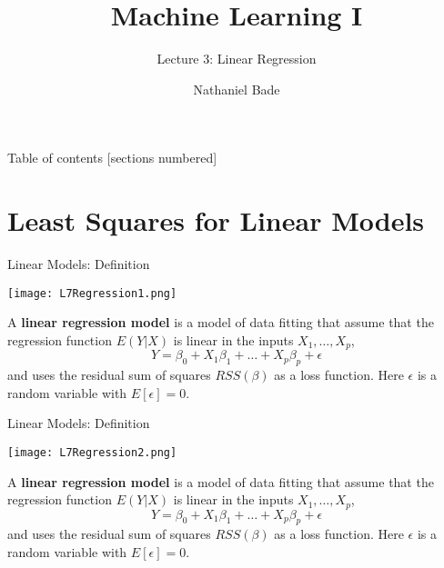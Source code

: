 \documentclass[10pt, table, dvipsnames,xcdraw, handout ]{beamer}
\title{Machine Learning I}
\subtitle{Lecture 3: Linear Regression}
\date{}
\author{Nathaniel Bade}
\institute{Northeastern University Department of Mathematics}
\begin{document}
\maketitle

\begin{frame}{Table of contents}
  [sections numbered]
  \tableofcontents[hideallsubsections]
\end{frame}





\section{Least Squares for Linear Models}



\begin{frame}[fragile]{Linear Models: Definition}
  \begin{minipage}[t][0.5\textheight][t]{\textwidth}
	\centering \texttt{[image: L7Regression1.png]} 
  \end{minipage}
  \vfill
\begin{minipage}[t][0.5\textheight][t]{\textwidth}
A \textbf{linear regression model} is a model of data fitting that assume that the regression function $E(Y|X)$ is linear in the inputs $X_1,\ldots, X_p$,
$$
Y = \beta_0 + X_1\beta_1 +\ldots + X_p\beta_p +  \epsilon
$$ 
and uses the residual sum of squares $RSS(\beta)$ as a loss function. Here $\epsilon$ is a random variable with $E[\epsilon] = 0$.
\end{minipage}
\end{frame}


\begin{frame}[fragile]{Linear Models: Definition}
  \begin{minipage}[t][0.5\textheight][t]{\textwidth}
	\centering \texttt{[image: L7Regression2.png]} 
  \end{minipage}
  \vfill
\begin{minipage}[t][0.5\textheight][t]{\textwidth}
A \textbf{linear regression model} is a model of data fitting that assume that the regression function $E(Y|X)$ is linear in the inputs $X_1,\ldots, X_p$,
$$
Y = \beta_0 + X_1\beta_1 +\ldots + X_p\beta_p + \epsilon
$$ 
and uses the residual sum of squares $RSS(\beta)$ as a loss function. Here $\epsilon$ is a random variable with $E[\epsilon] = 0$.
\end{minipage}
\end{frame}
\end{document}
